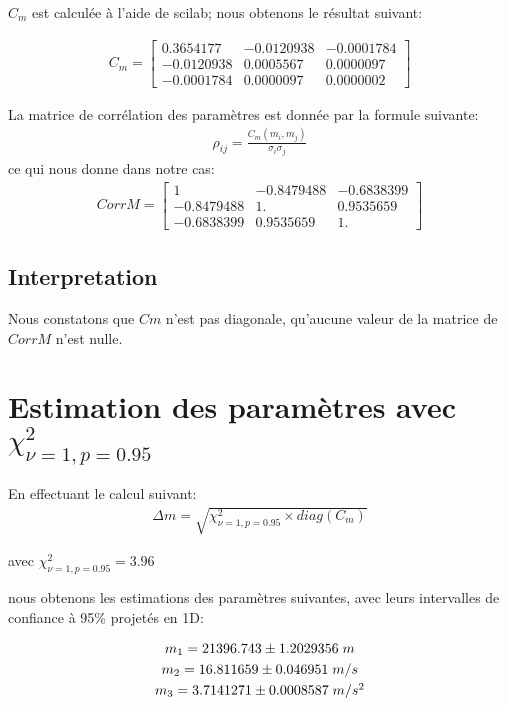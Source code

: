 \documentclass[12pt,a4paper]{extreport}
\begin{document}
$C_m$ est calculée à l'aide de scilab; nous obtenons le résultat suivant:

\begin{gather}
	C_m =
	\begin{bmatrix}
		0.3654177 & -0.0120938 & -0.0001784 \\
  		-0.0120938 &  0.0005567 &  0.0000097 \\
  		-0.0001784 &  0.0000097  & 0.0000002
	\end{bmatrix}
\end{gather}

La matrice de corrélation des paramètres est donnée par la formule suivante:
\begin{gather}
	\rho_{ij} = \frac{C_m(m_i,m_j)}{\sigma_i\sigma_j}
\end{gather}
ce qui nous donne dans notre cas:
\begin{gather}
	CorrM =
	\begin{bmatrix}
	1 &-0.8479488 & -0.6838399 \\
  -0.8479488  & 1.        &  0.9535659 \\
  -0.6838399 &  0.9535659  & 1.  
	\end{bmatrix}
\end{gather}

\subsection*{Interpretation}
Nous constatons que $Cm$ n'est pas diagonale, qu'aucune valeur de la matrice de $CorrM$ n'est nulle.

\section{Estimation des paramètres avec $\chi_{\nu=1,p=0.95}^2$}
En effectuant le calcul suivant:
\begin{gather}
	\Delta m = \sqrt{\chi_{\nu=1,p=0.95}^2 \times diag(C_m)}
\end{gather}

avec $\chi_{\nu=1,p=0.95}^2 = 3.96$


nous obtenons les estimations des paramètres suivantes, avec leurs intervalles de confiance à 95\% projetés en 1D:

\begin{equation}
	\begin{array}{c}
		m_1 = 21396.743 \pm 1.2029356\;m\\
		[\jot] m_2 = 16.811659 \pm 0.046951\;m/s\\
		[\jot] m_3 = 3.7141271 \pm 0.0008587\;m/s^2
	\end{array}
\end{equation}
\end{document}
